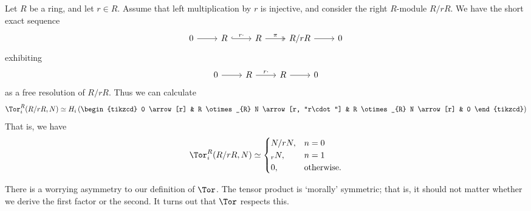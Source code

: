 \documentclass[main.tex]{subfiles}
\begin{document}
\begin{example}
  Let $R$ be a ring, and let $r \in R$. Assume that left multiplication by $r$ is injective, and consider the right $R$-module $R/rR$. We have the short exact sequence
  \begin{equation*}
    \begin{tikzcd}
      0
      \arrow[r]
      & R
      \arrow[r, hookrightarrow, "r\cdot"]
      & R
      \arrow[r, twoheadrightarrow, "\pi"]
      & R/rR
      \arrow[r]
      & 0
    \end{tikzcd}
  \end{equation*}
  exhibiting
  \begin{equation*}
    \begin{tikzcd}
      0
      \arrow[r]
      & R
      \arrow[r, "r\cdot"]
      & R
      \arrow[r]
      & 0
    \end{tikzcd}
  \end{equation*}
  as a free resolution of $R/rR$. Thus we can calculate
  \begin{equation*}
    \Tor^{R}_{i}(R/rR, N) \simeq H_{i}
    \left(
    \begin{tikzcd}
      0
      \arrow[r]
      & R \otimes_{R} N
      \arrow[r, "r\cdot"]
      & R \otimes_{R} N
      \arrow[r]
      & 0
    \end{tikzcd}
    \right)
  \end{equation*}
  That is, we have
  \begin{equation*}
    \Tor^{R}_{i}(R/rR, N) \simeq
    \begin{cases}
      N/rN, & n = 0 \\
      _{r}N, & n = 1 \\
      0, &\text{otherwise}.
    \end{cases}
  \end{equation*}
\end{example}

There is a worrying asymmetry to our definition of $\Tor$. The tensor product is `morally' symmetric; that is, it should not matter whether we derive the first factor or the second. It turns out that $\Tor$ respects this.
\end{document}
